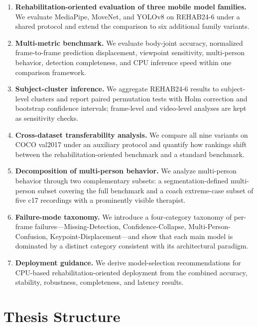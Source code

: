 \begin{enumerate}
  \item \textbf{Rehabilitation-oriented evaluation of three mobile model families.} We evaluate MediaPipe, MoveNet, and YOLOv8 on REHAB24-6 under a shared protocol and extend the comparison to six additional family variants.

  \item \textbf{Multi-metric benchmark.} We evaluate body-joint accuracy, normalized frame-to-frame prediction displacement, viewpoint sensitivity, multi-person behavior, detection completeness, and CPU inference speed within one comparison framework.

  \item \textbf{Subject-cluster inference.} We aggregate REHAB24-6 results to subject-level clusters and report paired permutation tests with Holm correction and bootstrap confidence intervals; frame-level and video-level analyses are kept as sensitivity checks.

  \item \textbf{Cross-dataset transferability analysis.} We compare all nine variants on COCO val2017 under an auxiliary protocol and quantify how rankings shift between the rehabilitation-oriented benchmark and a standard benchmark.

  \item \textbf{Decomposition of multi-person behavior.} We analyze multi-person behavior through two complementary subsets: a segmentation-defined multi-person subset covering the full benchmark and a coach extreme-case subset of five c17 recordings with a prominently visible therapist.

  \item \textbf{Failure-mode taxonomy.} We introduce a four-category taxonomy of per-frame failures---Missing-Detection, Confidence-Collapse, Multi-Person-Confusion, Keypoint-Displacement---and show that each main model is dominated by a distinct category consistent with its architectural paradigm.

  \item \textbf{Deployment guidance.} We derive model-selection recommendations for CPU-based rehabilitation-oriented deployment from the combined accuracy, stability, robustness, completeness, and latency results.
\end{enumerate}


\section{Thesis Structure}
\label{sec:thesis-structure}


